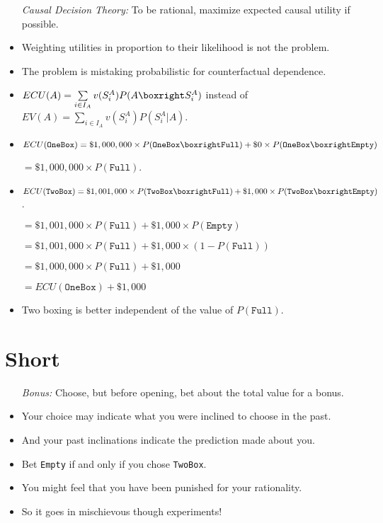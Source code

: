 \documentclass[a4paper, 11pt]{article} %
\begin{document}
\begin{itemize}
  \item[\it Causal Decision Theory:] To be rational, maximize expected causal utility if possible.
    \item Weighting utilities in proportion to their likelihood is not the problem.
    \item The problem is mistaking probabilistic for counterfactual dependence.
    \item $ECU(A) = \sum\limits_{i \in I_A} v(S_i^A)P(A \boxright S_i^A)$ instead of $EV(A) = \sum\limits_{i \in I_A} v(S_i^A)P(S_i^A | A)$.
    \item \mbox{$ECU(\texttt{OneBox}) = \$1,000,000\times P(\texttt{OneBox} \boxright \texttt{Full}) + \$0\times P(\texttt{OneBox} \boxright \texttt{Empty})$}
    \item[] \hspace{.94in} $= \$1,000,000\times P(\texttt{Full})$.
    \item \mbox{$ECU(\texttt{TwoBox}) = \$1,001,000\times P(\texttt{TwoBox} \boxright \texttt{Full}) + \$1,000\times P(\texttt{TwoBox} \boxright \texttt{Empty})$.}
    \item[] \hspace{.94in} $= \$1,001,000\times P(\texttt{Full}) + \$1,000\times P(\texttt{Empty})$
    \item[] \hspace{.94in} $= \$1,001,000\times P(\texttt{Full}) + \$1,000\times (1 - P(\texttt{Full}))$
    \item[] \hspace{.94in} $= \$1,000,000\times P(\texttt{Full}) + \$1,000$
    \item[] \hspace{.94in} $= ECU(\texttt{OneBox}) + \$1,000$
    \item Two boxing is better independent of the value of $P(\texttt{Full})$.
\end{itemize}




\section*{Short}

\begin{itemize}
  \item[\it Bonus:] Choose, but before opening, bet about the total value for a bonus.
    \item Your choice may indicate what you were inclined to choose in the past.
    \item And your past inclinations indicate the prediction made about you.
    \item Bet \texttt{Empty} if and only if you chose \texttt{TwoBox}.
    \item You might feel that you have been punished for your rationality.
    \item So it goes in mischievous though experiments!
\end{itemize}
\end{document}
